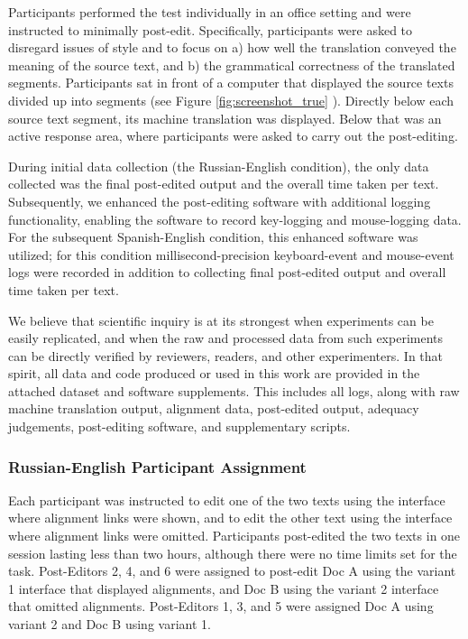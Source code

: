 Participants performed the test individually in an office setting and were instructed to minimally post-edit. 
%
Specifically, participants were asked to disregard issues of style and to focus on 
%
a) how well the translation conveyed the meaning of the source text, and 
%
b) the grammatical correctness of the translated segments. 
%
Participants sat in front of a computer that displayed the source texts divided up into segments (see Figure \ref{fig:screenshot_true} ). %
%
Directly below each source text segment, its machine translation was displayed.
%
Below that was an active response area, where participants were asked to carry out the post-editing.

During initial data collection (the Russian-English condition), the only data collected was the final post-edited output and the overall time taken per text.
%
Subsequently, we enhanced the post-editing software with additional logging functionality, enabling the software to record key-logging and mouse-logging data.
%
For the subsequent Spanish-English condition, this enhanced software was utilized; for this condition millisecond-precision keyboard-event and mouse-event logs were recorded in addition to collecting final post-edited output and overall time taken per text.

We believe that scientific inquiry is at its strongest when experiments can be easily replicated, and when the raw and processed data from such experiments can be directly verified by reviewers, readers, and other experimenters.
%
In that spirit, all data and code produced or used in this work are provided in the attached dataset and software supplements.
%
This includes all logs, along with raw machine translation output, alignment data, post-edited output, adequacy judgements, post-editing software, and supplementary scripts.


 

\subsubsection{Russian-English Participant Assignment}




Each participant was instructed to edit one of the two texts using the interface where alignment links were shown,
%
and to edit the other text using the interface where alignment links were omitted.
%
Participants post-edited the two texts in one session lasting less than two hours, although there were no time limits set for the task.
%
Post-Editors 2, 4, and 6 were assigned to post-edit Doc A using the variant 1 interface that displayed alignments, and Doc B using the variant 2 interface that omitted alignments.
%
Post-Editors 1, 3, and 5 were assigned Doc A using variant 2 and Doc B using variant 1.

